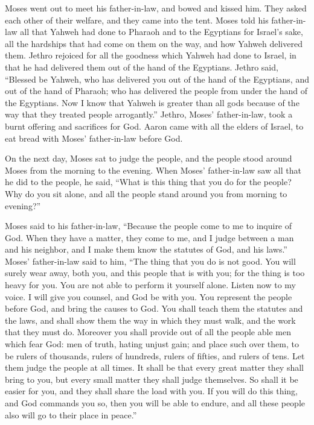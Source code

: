  Moses went out to meet his father-in-law, and bowed and
kissed him. They asked each other of their welfare, and they came into
the tent.  Moses told his father-in-law all that Yahweh
had done to Pharaoh and to the Egyptians for Israel's sake, all the
hardships that had come on them on the way, and how Yahweh delivered
them.  Jethro rejoiced for all the goodness which Yahweh
had done to Israel, in that he had delivered them out of the hand of the
Egyptians.  Jethro said, ``Blessed be Yahweh, who has
delivered you out of the hand of the Egyptians, and out of the hand of
Pharaoh; who has delivered the people from under the hand of the
Egyptians.  Now I know that Yahweh is greater than all
gods because of the way that they treated people arrogantly.''
 Jethro, Moses' father-in-law, took a burnt offering and
sacrifices for God. Aaron came with all the elders of Israel, to eat
bread with Moses' father-in-law before God.

 On the next day, Moses sat to judge the people, and the
people stood around Moses from the morning to the evening.
 When Moses' father-in-law saw all that he did to the
people, he said, ``What is this thing that you do for the people? Why do
you sit alone, and all the people stand around you from morning to
evening?''

 Moses said to his father-in-law, ``Because the people
come to me to inquire of God.  When they have a matter,
they come to me, and I judge between a man and his neighbor, and I make
them know the statutes of God, and his laws.''  Moses'
father-in-law said to him, ``The thing that you do is not good.
 You will surely wear away, both you, and this people
that is with you; for the thing is too heavy for you. You are not able
to perform it yourself alone.  Listen now to my voice. I
will give you counsel, and God be with you. You represent the people
before God, and bring the causes to God.  You shall teach
them the statutes and the laws, and shall show them the way in which
they must walk, and the work that they must do.  Moreover
you shall provide out of all the people able men which fear God: men of
truth, hating unjust gain; and place such over them, to be rulers of
thousands, rulers of hundreds, rulers of fifties, and rulers of tens.
 Let them judge the people at all times. It shall be that
every great matter they shall bring to you, but every small matter they
shall judge themselves. So shall it be easier for you, and they shall
share the load with you.  If you will do this thing, and
God commands you so, then you will be able to endure, and all these
people also will go to their place in peace.''

